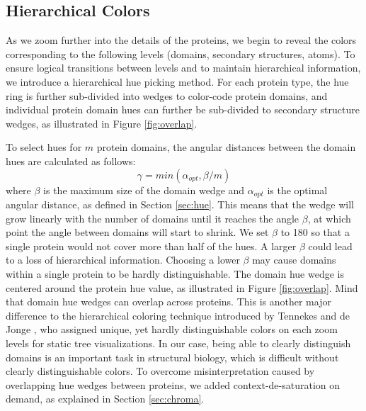 \documentclass{egpubl}
\begin{document}
	\subsection{Hierarchical Colors}
	\label{sec:hierarchy}
	
	
	
	As we zoom further into the details of the proteins, we begin to reveal the colors corresponding to the following levels (domains, secondary structures, atoms). 
	To ensure logical transitions between levels and to maintain hierarchical information, we introduce a hierarchical hue picking method. 
	For each protein type, the hue ring is further sub-divided into wedges to color-code protein domains, and individual protein domain hues can further be sub-divided to secondary structure wedges, as illustrated in Figure \ref{fig:overlap}. 
	
	To select hues for $m$ protein domains, the angular distances between the domain hues are calculated as follows: 
	\[
	\gamma = min(\alpha_{opt}, \beta / m)
	\]
	where $\beta$ is the maximum size of the domain wedge and $\alpha_{opt}$ is the optimal angular distance, as defined in Section \ref{sec:hue}.
	This means that the wedge will grow linearly with the number of domains until it reaches the angle $\beta$, at which point the angle between domains will start to shrink. 
	We set $\beta$ to 180 so that a single protein would not cover more than half of the hues. 
	A larger $\beta$ could lead to a loss of hierarchical information. 
	Choosing a lower $\beta$ may cause domains within a single protein to be hardly distinguishable.  
	The domain hue wedge is centered around the protein hue value, as illustrated in Figure \ref{fig:overlap}.
	Mind that domain hue wedges can overlap across proteins. 
	This is another major difference to the hierarchical coloring technique introduced by Tennekes and de Jonge \cite{tennekes2014tree}, who assigned unique, yet hardly distinguishable colors on each zoom levels for static tree visualizations. 
	In our case, being able to clearly distinguish domains is an important task in structural biology, which is difficult without clearly distinguishable colors. 
	To overcome misinterpretation caused by overlapping hue wedges between proteins, we added context-de-saturation on demand, as explained in Section \ref{sec:chroma}. 
	
\end{document}
